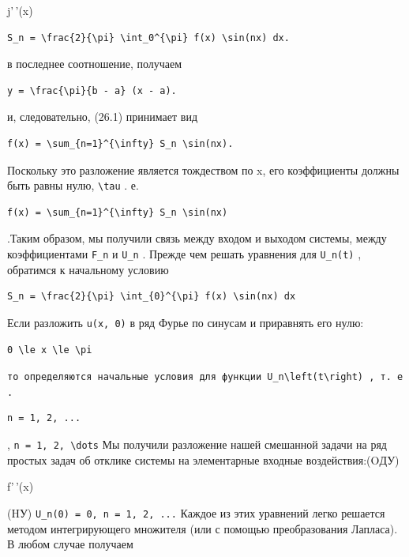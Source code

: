 \documentclass[
  ukrainian,
]{article}
\begin{document}
j'\,'(x)

\begin{verbatim}
S_n = \frac{2}{\pi} \int_0^{\pi} f(x) \sin(nx) dx.
\end{verbatim}

в последнее соотношение, получаем

\begin{verbatim}
y = \frac{\pi}{b - a} (x - a).
\end{verbatim}

и, следовательно, (26.1) принимает вид

\begin{verbatim}
f(x) = \sum_{n=1}^{\infty} S_n \sin(nx).
\end{verbatim}

Поскольку это разложение является тождеством по x, его коэффициенты
должны быть равны нулю, \texttt{\textbackslash{}tau} . е.

\begin{verbatim}
f(x) = \sum_{n=1}^{\infty} S_n \sin(nx)
\end{verbatim}

.Таким образом, мы получили связь между входом и выходом системы, между
коэффициентами \texttt{F\_n} и \texttt{U\_n} . Прежде чем решать
уравнения для \texttt{U\_n(t)} , обратимся к начальному условию

\begin{verbatim}
S_n = \frac{2}{\pi} \int_{0}^{\pi} f(x) \sin(nx) dx
\end{verbatim}

Если разложить \texttt{u(x,\ 0)} в ряд Фурье по синусам и приравнять его
нулю:

\begin{verbatim}
0 \le x \le \pi
\end{verbatim}

\texttt{то\ определяются\ начальные\ условия\ для\ функции\ \textquotesingle{}U\_n\textbackslash{}left(t\textbackslash{}right)\textquotesingle{}\ ,\ т.\ е.}

\begin{verbatim}
n = 1, 2, ...
\end{verbatim}

, \texttt{n\ =\ 1,\ 2,\ \textbackslash{}dots} Мы получили разложение
нашей смешанной задачи на ряд простых задач об отклике системы на
элементарные входные воздействия:(OДУ)

f'\,'(x)

(HУ) \texttt{U\_n(0)\ =\ 0,\ n\ =\ 1,\ 2,\ ...} Каждое из этих уравнений
легко решается методом интегрирующего множителя (или с помощью
преобразования Лапласа). В любом случае получаем
\end{document}
